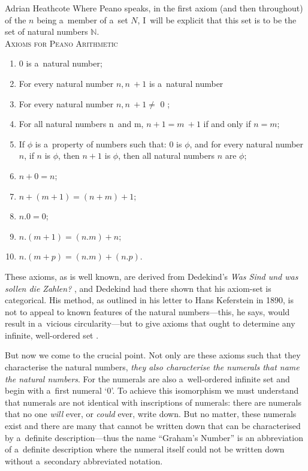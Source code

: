 \begin{artengenv}{Adrian Heathcote}
Where Peano speaks, in the first axiom (and then throughout) of the $n$ being a~member of a~set $N$, I~will be explicit that this set is to be the set of natural numbers $\mathbb{N}$. \\

\noindent\textsc{Axioms for Peano Arithmetic}

\begin{enumerate}[label=P\Roman* :]

  \item 0 is a~natural number;
  
  \item For every natural number $n, n~+ 1$ is a~natural number
  
  \item For every natural number $n, n~+ 1 \neq$ 0 ;
  
  \item For all natural numbers n~and m, $n + 1 = m~+ 1$ if and only if $n = m$;
  
  \item If $\phi$ is a~property of numbers such that: 0 is $\phi$, and for every natural number $n$, if $n$ is $\phi$, then $n + 1$ is $\phi$, then all natural numbers $n$ are $\phi$;
  
  \item $n + 0 = n$;
  
  \item $n + (m + 1) = (n + m) + 1$;
  
  \item $n . 0 = 0$;
  
  \item $n . (m + 1) =  (n . m) + n$;
  
  \item $n . (m + p) = (n . m) + (n . p)$.\\
\end{enumerate}

These axioms, as is well known, are derived from Dedekind's \textit{Was Sind und was sollen die Zahlen?} \parencite*{dedekind_was_1888}, and Dedekind had there shown that his axiom-set is categorical. His method, as outlined in his letter to Hans Keferstein in 1890, is not to appeal to known features of the natural numbers---this, he says, would result in a~vicious circularity---but to give axioms that ought to determine any infinite, well-ordered set \parencite{van_heijenoort_frege_1967}.

But now we come to the crucial point. Not only are these axioms such that they characterise the natural numbers, \emph{they also characterise the numerals that \emph{name} the natural numbers}. For the numerals are also a~well-ordered infinite set and begin with a~first numeral `0'. To achieve this isomorphism we must understand that numerals are not identical with inscriptions of numerals: there are numerals that no one \textit{will} ever, or \textit{could} ever, write down. But no matter, these numerals exist and there are many that cannot be written down that can be characterised by a~definite description---thus the name ``Graham's Number'' is an abbreviation of a~definite description where the numeral itself could not be written down without a~secondary abbreviated notation. 


\end{artengenv}
